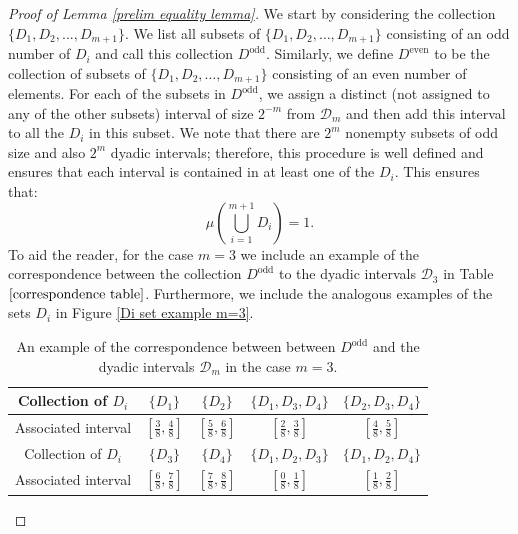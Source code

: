 \documentclass[12pt]{article}
\begin{document}
\begin{proof}[Proof of Lemma \ref{prelim equality lemma}]
    We start by considering the collection $\{D_1,D_2,...,D_{m+1}\}$.
    We list all subsets of \mbox{$\{D_1,\allowbreak D_2,\allowbreak \dots,\allowbreak D_{m+1}\}$} consisting of an odd number of $D_i$ and call this collection $D^{\textrm{odd}}$. Similarly, we define $D^{\textrm{even}}$ to be the collection of subsets of $\{D_1,D_2,\dots,D_{m+1}\}$ consisting of an even number of elements. For each of the subsets in $D^{\textrm{odd}}$, we assign a distinct (not assigned to any of the other subsets) interval of size $2^{-m}$ from $\mathcal{D}_m$ and then add this interval to all the $D_i$ in this subset. We note that there are $2^m$ nonempty subsets of odd size and also $2^m$ dyadic intervals; therefore, this procedure is well defined and ensures that each interval is contained in at least one of the $D_i$. This ensures that:
    \[\mu \left( \bigcup_{i=1}^{m+1}D_i \right) =1.\]
    To aid the reader, for the case $m=3$ we include an example of the correspondence between the collection $D^{\textrm{odd}}$ to the dyadic intervals $\mathcal{D}_3$ in Table $\ref{correspondence table}$. Furthermore, we include the analogous examples of the sets $D_i$ in Figure \ref{Di set example m=3}.

\begin{table}[h]
        \centering \caption{An example of the correspondence between  between $D^{\textrm{odd}}$ and the dyadic intervals $\mathcal{D}_m$ in the case $m=3$. }
\vspace{10pt}
{\renewcommand{\arraystretch}{2}
    \begin{tabular}{|c|c|c|c|c|}
\hline
Collection of $D_i$ & $\{D_1 \}$ & $\{D_2\}$ & $\{D_1,D_3,D_4\}$  & $\{D_2,D_3,D_4\}$  \\
\hline
Associated interval & $ \left[ \frac{3}{8}, \frac{4}{8} \right] $ & $ \left[ \frac{5}{8}, \frac{6}{8} \right] $ & $ \left[ \frac{2}{8}, \frac{3}{8} \right] $ & $ \left[ \frac{4}{8}, \frac{5}{8} \right] $ \\
\hline
\hline
Collection of $D_i$ & $\{D_3 \}$ & $\{D_4\}$ & $\{D_1,D_2,D_3\}$  & $\{D_1,D_2,D_4\}$  \\
\hline
Associated interval & $ \left[ \frac{6}{8}, \frac{7}{8} \right] $ & $ \left[ \frac{7}{8}, \frac{8}{8} \right] $ & $ \left[ \frac{0}{8}, \frac{1}{8} \right] $ & $ \left[ \frac{1}{8}, \frac{2}{8} \right] $ \\
\hline
    \end{tabular}}
    \label{correspondence table}
\end{table}


\end{proof}
\end{document}
